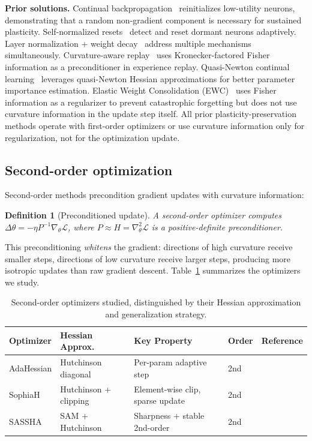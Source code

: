 \documentclass{article}
\newtheorem{definition}{Definition}
\newcommand{\cL}{\mathcal{L}}
\begin{document}
\textbf{Prior solutions.} Continual backpropagation~\citep{dohare2024loss} reinitializes low-utility neurons, demonstrating that a random non-gradient component is necessary for sustained plasticity. Self-normalized resets~\citep{lewandowski2025snr} detect and reset dormant neurons adaptively. Layer normalization + weight decay~\citep{lyle2025disentangling} address multiple mechanisms simultaneously. Curvature-aware replay~\citep{urettini2025ocar} uses Kronecker-factored Fisher information as a preconditioner in experience replay. Quasi-Newton continual learning~\citep{kong2025csqn} leverages quasi-Newton Hessian approximations for better parameter importance estimation. Elastic Weight Consolidation (EWC)~\citep{kirkpatrick2017ewc} uses Fisher information as a regularizer to prevent catastrophic forgetting but does not use curvature information in the update step itself. All prior plasticity-preservation methods operate with first-order optimizers or use curvature information only for regularization, not for the optimization update.

\subsection{Second-order optimization}

Second-order methods precondition gradient updates with curvature information:

\begin{definition}[Preconditioned update]
A second-order optimizer computes $\Delta \theta = -\eta P^{-1} \nabla_\theta \cL$, where $P \approx H = \nabla^2_\theta \cL$ is a positive-definite preconditioner.
\end{definition}

This preconditioning \emph{whitens} the gradient: directions of high curvature receive smaller steps, directions of low curvature receive larger steps, producing more isotropic updates than raw gradient descent. Table~\ref{tab:optimizers} summarizes the optimizers we study.

\begin{table}[t]
\caption{Second-order optimizers studied, distinguished by their Hessian approximation and generalization strategy.}
\label{tab:optimizers}
\centering
\small
\begin{tabular}{@{}lllll@{}}
\toprule
\textbf{Optimizer} & \textbf{Hessian Approx.} & \textbf{Key Property} & \textbf{Order} & \textbf{Reference} \\
\midrule
AdaHessian & Hutchinson diagonal & Per-param adaptive step & 2nd & \citet{yao2021adahessian} \\
SophiaH & Hutchinson + clipping & Element-wise clip, sparse update & 2nd & \citet{liu2023sophia} \\
SASSHA & SAM + Hutchinson & Sharpness + stable 2nd-order & 2nd & \citet{shin2025sassha} \\
\bottomrule
\end{tabular}
\end{table}
\end{document}
